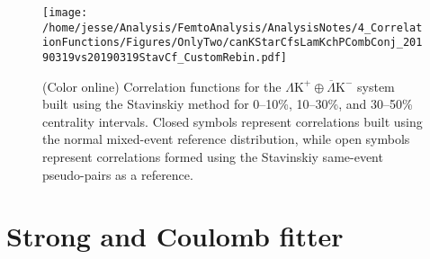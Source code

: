 \documentclass[ALICE,manyauthors]{cernphprep}
\newcommand{\LamKchP}{$\Lambda\mathrm{K^{+}}$\xspace}
\begin{document}
\begin{figure}[h!]
  \centering
  \texttt{[image: /home/jesse/Analysis/FemtoAnalysis/AnalysisNotes/4\_CorrelationFunctions/Figures/OnlyTwo/canKStarCfsLamKchPCombConj\_20190319vs20190319StavCf\_CustomRebin.pdf]}
  \caption[\LamKchP Stavinskiy Correlation Functions]
  {
  (Color online) Correlation functions for the $\Lambda\mathrm{K^{+}}\oplus\overline{\Lambda}\mathrm{K^{-}}$ system built using the Stavinskiy method for 0--10\%, 10--30\%, and 30--50\% centrality intervals.  Closed symbols represent correlations built using the normal mixed-event reference distribution, while open symbols represent correlations formed using the Stavinskiy same-event pseudo-pairs as a reference.
  }
  \label{fig:StavCfs_Correct_LamKchP}
\end{figure} 



\section{Strong and Coulomb fitter}
\label{App:CoulombFitter}
\end{document}
